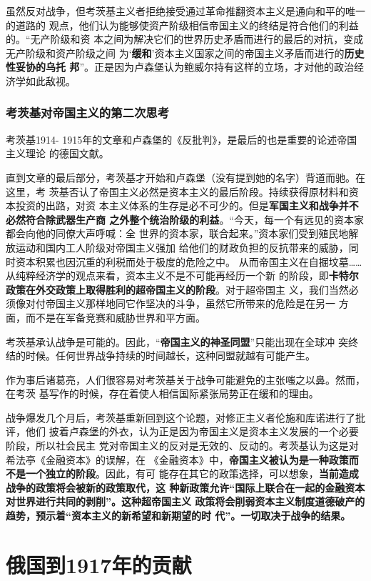 虽然反对战争，但考茨基主义者拒绝接受通过革命推翻资本主义是通向和平的唯一的道路的
观点，他们认为能够使资产阶级相信帝国主义的终结是符合他们的利益的。“无产阶级和资
本之间为解决它们的世界历史矛盾而进行的最后的对抗，变成无产阶级和资产阶级之间
为‘\textbf{缓和}’资本主义国家之间的帝国主义矛盾而进行的\textbf{历史性妥协的乌托
  邦}”。正是因为卢森堡认为鲍威尔持有这样的立场，才对他的政治经济学如此敌视。


\section{考茨基对帝国主义的第二次思考}
考茨基1914- 1915年的文章和卢森堡的《反批判》，是最后的也是重要的论述帝国主义理论
的德国文献。

直到文章的最后部分，考茨基才开始和卢森堡（没有提到她的名字）背道而驰。在这里，考
茨基否认了帝国主义必然是资本主义的最后阶段。持续获得原材料和资本投资的出路，对资
本主义体系的生存是必不可少的。但是\textbf{军国主义和战争并不必然符合除武器生产商
  之外整个统治阶级的利益}。“今天，每一个有远见的资本家都会向他的同僚大声呼喊：全
世界的资本家，联合起来。”资本家们受到殖民地解放运动和国内工人阶级对帝国主义强加
给他们的财政负担的反抗带来的威胁，同时资本积累也因沉重的利税而处于极度的危险之中。
从而帝国主义在自掘坟墓……从纯粹经济学的观点来看，资本主义不是不可能再经历一个新
的阶段，即\textbf{卡特尔政策在外交政策上取得胜利的超帝国主义的阶段}。对于超帝国主
义，我们当然必须像对付帝国主义那样地同它作坚决的斗争，虽然它所带来的危险是在另一
方面，而不是在军备竞赛和威胁世界和平方面。

考茨基承认战争是可能的。因此，“\textbf{帝国主义的神圣同盟}”只能出现在全球冲
突终结的时候。任何世界战争持续的时间越长，这种同盟就越有可能产生。

作为事后诸葛亮，人们很容易对考茨基关于战争可能避免的主张嗤之以鼻。然而，在考茨
基写作的时候，存在着使人相信国际紧张局势正在缓和的理由。

战争爆发几个月后，考茨基重新回到这个论题，对修正主义者伦施和库诺进行了批评，他们
披着卢森堡的外衣，认为正是因为帝国主义是资本主义发展的一个必要阶段，所以社会民主
党对帝国主义的反对是无效的、反动的。考茨基认为这是对希法亭《金融资本》的误解，在
《金融资本》中，\textbf{帝国主义被认为是一种政策而不是一个独立的阶段}。因此，有可
能存在其它的政策选择，可以想象，\textbf{当前造成战争的政策将会被新的政策取代，这
  种新政策允许“国际上联合在一起的金融资本对世界进行共同的剥削”。这种超帝国主义
  政策将会削弱资本主义制度道德破产的趋势，预示着“资本主义的新希望和新期望的时
  代”。一切取决于战争的结果。}

\part{俄国到1917年的贡献}
\label{part:russia}

